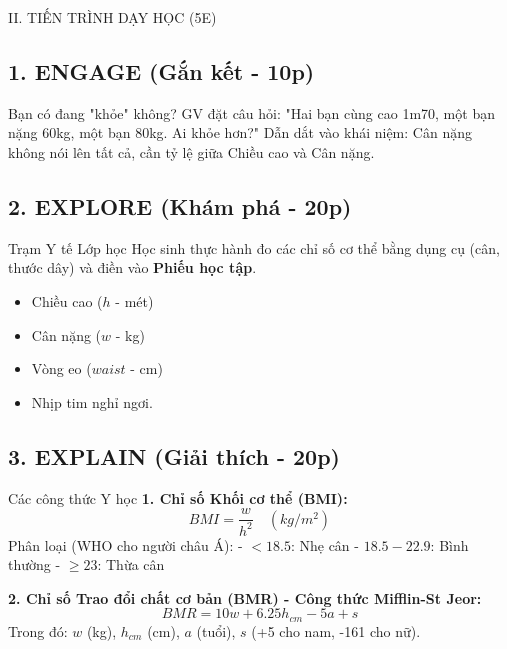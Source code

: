 \documentclass[12pt,a4paper]{article}
\begin{document}
\begin{sectionbox}{II. TIẾN TRÌNH DẠY HỌC (5E)}

\subsection*{1. ENGAGE (Gắn kết - 10p)}
\begin{activitybox}{Bạn có đang "khỏe" không?}
GV đặt câu hỏi: "Hai bạn cùng cao 1m70, một bạn nặng 60kg, một bạn 80kg. Ai khỏe hơn?"
Dẫn dắt vào khái niệm: Cân nặng không nói lên tất cả, cần tỷ lệ giữa Chiều cao và Cân nặng.
\end{activitybox}

\subsection*{2. EXPLORE (Khám phá - 20p)}
\begin{activitybox}{Trạm Y tế Lớp học}
Học sinh thực hành đo các chỉ số cơ thể bằng dụng cụ (cân, thước dây) và điền vào \textbf{Phiếu học tập}.
\begin{itemize}
    \item Chiều cao ($h$ - mét)
    \item Cân nặng ($w$ - kg)
    \item Vòng eo ($waist$ - cm)
    \item Nhịp tim nghỉ ngơi.
\end{itemize}
\end{activitybox}

\subsection*{3. EXPLAIN (Giải thích - 20p)}
\begin{mathbox}{Các công thức Y học}
\textbf{1. Chỉ số Khối cơ thể (BMI):}
$$ BMI = \frac{w}{h^2} \quad (kg/m^2) $$
Phân loại (WHO cho người châu Á):
- $< 18.5$: Nhẹ cân
- $18.5 - 22.9$: Bình thường
- $\ge 23$: Thừa cân

\textbf{2. Chỉ số Trao đổi chất cơ bản (BMR) - Công thức Mifflin-St Jeor:}
$$ BMR = 10w + 6.25h_{cm} - 5a + s $$
Trong đó: $w$ (kg), $h_{cm}$ (cm), $a$ (tuổi), $s$ (+5 cho nam, -161 cho nữ). 
\end{mathbox}


\end{sectionbox}
\end{document}
